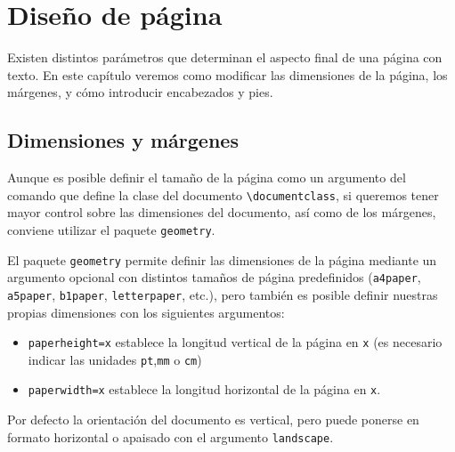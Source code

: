 \documentclass[
  spanish,
  a4paper,
]{scrreport}
\providecommand{\tightlist}{%
  \setlength{\itemsep}{0pt}\setlength{\parskip}{0pt}}
\theoremstyle{definition}
\theoremstyle{remark}
\begin{document}

\chapter{Diseño de página}\label{diseuxf1o-de-puxe1gina}

Existen distintos parámetros que determinan el aspecto final de una
página con texto. En este capítulo veremos como modificar las
dimensiones de la página, los márgenes, y cómo introducir encabezados y
pies.

\section{Dimensiones y márgenes}\label{dimensiones-y-muxe1rgenes}

Aunque es posible definir el tamaño de la página como un argumento del
comando que define la clase del documento
\texttt{\textbackslash{}documentclass}, si queremos tener mayor control
sobre las dimensiones del documento, así como de los márgenes, conviene
utilizar el paquete \texttt{geometry}.

El paquete \texttt{geometry} permite definir las dimensiones de la
página mediante un argumento opcional con distintos tamaños de página
predefinidos (\texttt{a4paper}, \texttt{a5paper}, \texttt{b1paper},
\texttt{letterpaper}, etc.), pero también es posible definir nuestras
propias dimensiones con los siguientes argumentos:

\begin{itemize}
\tightlist
\item
  \texttt{paperheight=x} establece la longitud vertical de la página en
  \texttt{x} (es necesario indicar las unidades \texttt{pt},\texttt{mm}
  o \texttt{cm})
\item
  \texttt{paperwidth=x} establece la longitud horizontal de la página en
  \texttt{x}.
\end{itemize}

Por defecto la orientación del documento es vertical, pero puede ponerse
en formato horizontal o apaisado con el argumento \texttt{landscape}.
\end{document}

